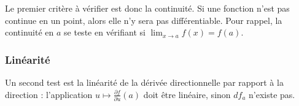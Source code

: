 Le premier critère à vérifier est donc la continuité. Si une fonction n'est pas continue en un point, alors elle n'y sera pas différentiable. Pour rappel, la continuité en $a$ se teste en vérifiant si $\lim_{x\to a}f(x)=f(a)$.

                    \subsubsection{Linéarité}

Un second test est la linéarité de la dérivée directionnelle par rapport à la direction : l'application $u\mapsto\frac{ \partial f }{ \partial u }(a)$ doit être linéaire, sinon $df_a$ n'existe pas.

